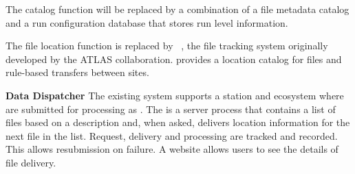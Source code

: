 \documentclass[../main-v1.tex]{subfiles}
\begin{document}
\begin{description}
\item{\bf {}}  The catalog function will be replaced by a combination of a file metadata catalog  and a run configuration database that stores run level information.
\item{\bf {}}  The file location function is replaced by ~\cite{Barisits:2019fyl}, the file tracking system originally developed by the ATLAS collaboration.  provides a location catalog for files and rule-based transfers between sites. 
\item{\bf Data Dispatcher} The existing  system supports a station and  ecosystem where  are submitted for processing as .  The  is a server process that contains a list of files based on a  description  and, when asked, delivers location information for the next file in the list.  Request, delivery and processing are tracked and recorded. This allows resubmission on failure.  A website allows users to see the details of file delivery. 


\end{description}





\end{document}
